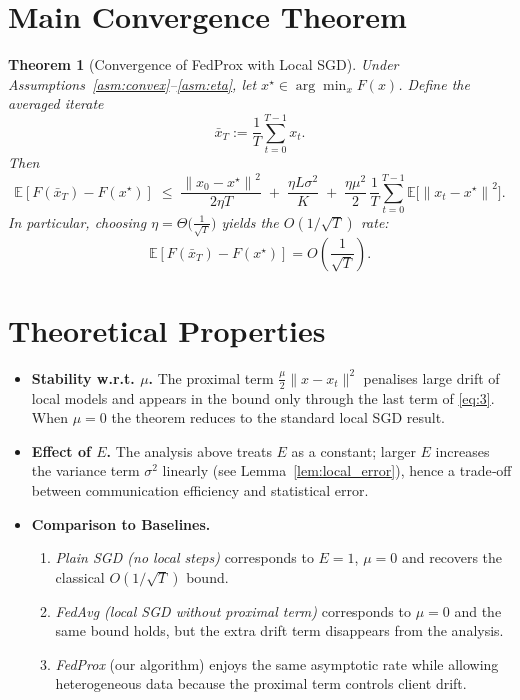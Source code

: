 \documentclass[11pt]{article}
\newtheorem{theorem}{Theorem}
\newcommand{\E}{\mathbb{E}}
\newcommand{\norm}[1]{\left\|#1\right\|}
\begin{document}
\section*{Main Convergence Theorem}
\begin{theorem}[Convergence of FedProx with Local SGD]\label{thm:main}
Under Assumptions~\ref{asm:convex}–\ref{asm:eta}, let $x^{\star}\in\arg\min_{x}F(x)$.  Define the averaged iterate
\[
    \bar x_T:=\frac1T\sum_{t=0}^{T-1}x_t .
\]
Then
\[
    \E\!\left[F(\bar x_T)-F(x^{\star})\right]
    \;\le\;
    \frac{\norm{x_0-x^{\star}}^{2}}{2\eta T}
    \;+\;
    \frac{\eta L\sigma^{2}}{K}
    \;+\;
    \frac{\eta\mu^{2}}{2} \,\frac{1}{T}\sum_{t=0}^{T-1}\E\!\bigl[\norm{x_t-x^{\star}}^{2}\bigr].
\tag{3}
\]
In particular, choosing $\eta=\Theta\bigl(\tfrac{1}{\sqrt{T}}\bigr)$ yields the $O(1/\sqrt{T})$ rate:
\[
    \E\!\left[F(\bar x_T)-F(x^{\star})\right]=O\!\left(\frac{1}{\sqrt{T}}\right).
\]
\end{theorem}

\section*{Theoretical Properties}
\begin{itemize}
    \item \textbf{Stability w.r.t. $\mu$.}  The proximal term $\frac{\mu}{2}\|x-x_t\|^{2}$ penalises large drift of local models and appears in the bound only through the last term of \eqref{eq:3}.  When $\mu=0$ the theorem reduces to the standard local SGD result.
    \item \textbf{Effect of $E$.}  The analysis above treats $E$ as a constant; larger $E$ increases the variance term $\sigma^{2}$ linearly (see Lemma~\ref{lem:local_error}), hence a trade‑off between communication efficiency and statistical error.
    \item \textbf{Comparison to Baselines.}
        \begin{enumerate}[label=\alph*)]
            \item \emph{Plain SGD (no local steps)} corresponds to $E=1$, $\mu=0$ and recovers the classical $O(1/\sqrt{T})$ bound.
            \item \emph{FedAvg (local SGD without proximal term)} corresponds to $\mu=0$ and the same bound holds, but the extra drift term disappears from the analysis.
            \item \emph{FedProx} (our algorithm) enjoys the same asymptotic rate while allowing heterogeneous data because the proximal term controls client drift.
        \end{enumerate}
\end{itemize}
\end{document}
